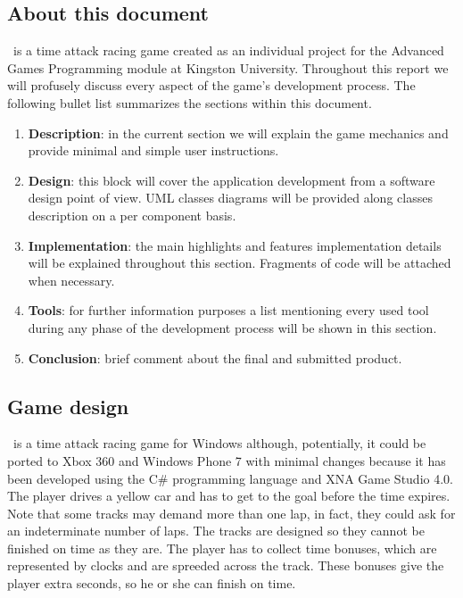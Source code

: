 
\subsection{About this document}

\game\ is a time attack racing game created as an individual project for the
Advanced Games Programming module at Kingston University. Throughout this
report we will profusely discuss every aspect of the game's development process.
The following bullet list summarizes the sections within this document.

\begin{enumerate}
	\item \textbf{Description}: in the current section we will explain the game
	mechanics and provide minimal and simple user instructions.
	\item \textbf{Design}: this block will cover the application development from
	a software design point of view. UML classes diagrams will be provided along classes
	description on a per component basis.
	\item \textbf{Implementation}: the main highlights and features implementation
	details will be explained throughout this section. Fragments of code will be
	attached when necessary.
	\item \textbf{Tools}: for further information purposes a list mentioning
	every used tool during any phase of the development process will be
	shown in this section.
	\item \textbf{Conclusion}: brief comment about the final and submitted product.
\end{enumerate}

\subsection{Game design}

\game\ is a time attack racing game for Windows although, potentially, it could be
ported to Xbox 360 and Windows Phone 7 with minimal changes because it has been
developed using the C\# programming language and XNA Game Studio 4.0.\\

The player drives a yellow car and has to get to the goal before the time expires.
Note that some tracks may demand more than one lap, in fact, they could ask for an
indeterminate number of laps. The tracks are designed so they cannot be finished
on time as they are. The player has to collect time bonuses, which are represented
by clocks and are spreeded across the track. These bonuses give the player extra seconds,
so he or she can finish on time.\\


